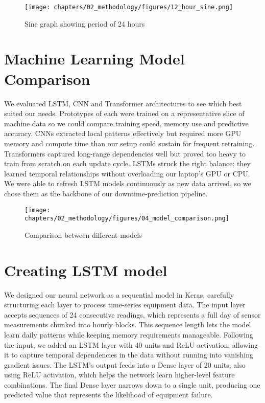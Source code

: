\begin{figure}[H]
    \centering
    \texttt{[image: chapters/02\_methodology/figures/12\_hour\_sine.png]}
    \caption{Sine graph showing period of 24 hours}
    \label{fig:sine-graph}
\end{figure}

\section{Machine Learning Model Comparison}
We evaluated LSTM, CNN and Transformer architectures to see which best suited our needs. Prototypes of each were trained on a representative slice of machine data so we could compare training speed, memory use and predictive accuracy. CNNs extracted local patterns effectively but required more GPU memory and compute time than our setup could sustain for frequent retraining. Transformers captured long-range dependencies well but proved too heavy to train from scratch on each update cycle. LSTMs struck the right balance: they learned temporal relationships without overloading our laptop’s GPU or CPU. We were able to refresh LSTM models continuously as new data arrived, so we chose them as the backbone of our downtime‐prediction pipeline.

\begin{figure}[H]
    \centering
    \texttt{[image: chapters/02\_methodology/figures/04\_model\_comparison.png]}
    \caption{Comparison between different models}
\end{figure}

\section{Creating LSTM model}
We designed our neural network as a sequential model in Keras, carefully structuring each layer to process time-series equipment data. The input layer accepts sequences of 24 consecutive readings, which represents a full day of sensor measurements chunked into hourly blocks. This sequence length lets the model learn daily patterns while keeping memory requirements manageable. Following the input, we added an LSTM layer with 40 units and ReLU activation, allowing it to capture temporal dependencies in the data without running into vanishing gradient issues. The LSTM's output feeds into a Dense layer of 20 units, also using ReLU activation, which helps the network learn higher-level feature combinations. The final Dense layer narrows down to a single unit, producing one predicted value that represents the likelihood of equipment failure. 

